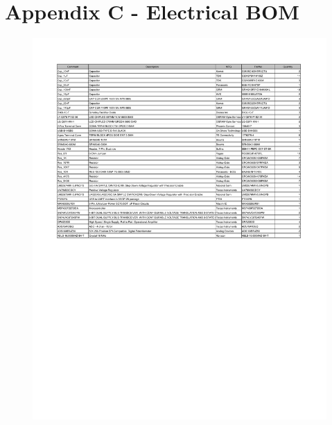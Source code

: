 \documentclass[oneside,final,a4paper]{report}
\begin{document}
\chapter*{Appendix C - Electrical BOM}
\begin{figure}[hbt]
 \centering
 \includegraphics[scale=0.5]{FYDP_BOM}
\end{figure}
\end{document}
